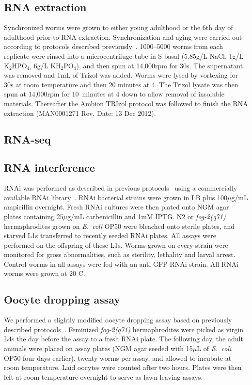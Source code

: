 \documentclass[9pt,twocolumn,twoside]{gsag3jnl}
\newcommand{\fog}{\emph{fog-2}}
\newcommand{\ecol}{\emph{E.~coli}}
\begin{document}
\subsection{RNA extraction}
\label{sb:rna_extraction}
Synchronized worms were grown to either young adulthood or the 6th day of adulthood prior to RNA extraction. Synchronization and aging were carried out according to protocols described previously~\citep{Leighton2014}. 1000--5000 worms from each replicate were rinsed into a microcentrifuge tube in S basal (5.85g/L NaCl, 1g/L $\mathrm{K}_2\mathrm{HPO}_4$, 6g/L $\mathrm{KH}_2\mathrm{PO}_4$), and then spun at 14,000rpm for 30s. The supernatant was removed and 1mL of Trizol was added. Worms were lysed by vortexing for 30s at room temperature and then 20 minutes at 4\degree. The Trizol lysate was then spun at 14,000rpm for 10~minutes at 4\degree{} down to allow removal of insoluble materials. Thereafter the Ambion TRIzol protocol was followed to finish the RNA extraction (MAN0001271 Rev. Date: 13 Dec 2012).

\subsection{RNA-seq}
\label{sb:rna_seq}

\subsection{RNA interference}
\label{sb:rnai}
RNAi was performed as described in previous protocols~\citep{Kamath2001} using a commercially available RNAi library~\citep{Kamath2003}. RNAi bacterial strains were grown in LB plus 100$\mu$g/mL ampicillin overnight. Fresh RNAi cultures were then plated onto NGM agar plates containing 25$\mu$g/mL carbenicillin and 1mM IPTG. N2 or \fog{}\emph{(q71)} hermaphrodites grown on \ecol{} OP50 were bleached onto sterile plates, and starved L1s transferred to recently seeded RNAi plates.
All assays were performed on the offspring of these L1s. Worms grown on every strain were monitored for gross abnormalities, such as sterility, lethality and larval arrest. Control worms in all assays were fed with an anti-GFP RNAi strain. All RNAi worms were grown at 20\degree{} C.

\subsection{Oocyte dropping assay}
\label{sb:oocyte_assay}
We performed a slightly modified oocyte dropping assay based on previously described protocols~\citep{White2012}. Feminized \fog{}\emph{(q71)} hermaphrodites were picked as virgin L4s the day before the assay to a fresh RNAi plate. The following day, the adult animals were placed on assay plates (NGM agar seeded with 15$\mu$L of \ecol{} OP50 four days earlier), twenty worms per assay, and allowed to incubate at room temperature. Laid oocytes were counted after two hours. Plates were then left at room temperature overnight to serve as lawn-leaving assays.
\end{document}
